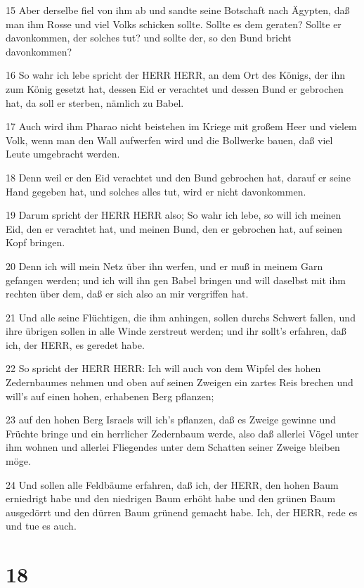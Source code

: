 \par 15 Aber derselbe fiel von ihm ab und sandte seine Botschaft nach Ägypten, daß man ihm Rosse und viel Volks schicken sollte. Sollte es dem geraten? Sollte er davonkommen, der solches tut? und sollte der, so den Bund bricht davonkommen?
\par 16 So wahr ich lebe spricht der HERR HERR, an dem Ort des Königs, der ihn zum König gesetzt hat, dessen Eid er verachtet und dessen Bund er gebrochen hat, da soll er sterben, nämlich zu Babel.
\par 17 Auch wird ihm Pharao nicht beistehen im Kriege mit großem Heer und vielem Volk, wenn man den Wall aufwerfen wird und die Bollwerke bauen, daß viel Leute umgebracht werden.
\par 18 Denn weil er den Eid verachtet und den Bund gebrochen hat, darauf er seine Hand gegeben hat, und solches alles tut, wird er nicht davonkommen.
\par 19 Darum spricht der HERR HERR also; So wahr ich lebe, so will ich meinen Eid, den er verachtet hat, und meinen Bund, den er gebrochen hat, auf seinen Kopf bringen.
\par 20 Denn ich will mein Netz über ihn werfen, und er muß in meinem Garn gefangen werden; und ich will ihn gen Babel bringen und will daselbst mit ihm rechten über dem, daß er sich also an mir vergriffen hat.
\par 21 Und alle seine Flüchtigen, die ihm anhingen, sollen durchs Schwert fallen, und ihre übrigen sollen in alle Winde zerstreut werden; und ihr sollt's erfahren, daß ich, der HERR, es geredet habe.
\par 22 So spricht der HERR HERR: Ich will auch von dem Wipfel des hohen Zedernbaumes nehmen und oben auf seinen Zweigen ein zartes Reis brechen und will's auf einen hohen, erhabenen Berg pflanzen;
\par 23 auf den hohen Berg Israels will ich's pflanzen, daß es Zweige gewinne und Früchte bringe und ein herrlicher Zedernbaum werde, also daß allerlei Vögel unter ihm wohnen und allerlei Fliegendes unter dem Schatten seiner Zweige bleiben möge.
\par 24 Und sollen alle Feldbäume erfahren, daß ich, der HERR, den hohen Baum erniedrigt habe und den niedrigen Baum erhöht habe und den grünen Baum ausgedörrt und den dürren Baum grünend gemacht habe. Ich, der HERR, rede es und tue es auch.

\chapter{18}

